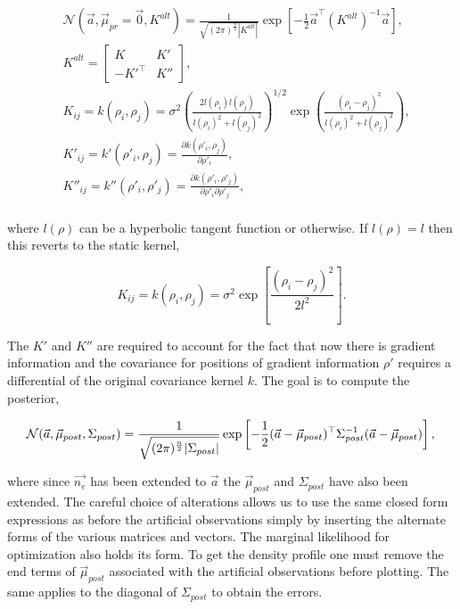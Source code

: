 \begin{equation}
\begin{aligned}
&\mathcal{N}(\vec{a}, \vec \mu_{pr} = \vec{0}, K^{alt}) = \frac{1}{\sqrt{(2\pi)^{\frac{n}{2}}|K^{alt}|}} \exp \left[{{-\frac{1}{2}\vec{a}^\top (K^{alt})^{-1}\vec{a}}}\right],\\
&K^{alt} = \begin{bmatrix} K & K'\\ -K'^\top & K''\end{bmatrix},\\
&K_{ij} = k(\rho_i, \rho_j) = \sigma^2 \left( \frac{2l(\rho_i)l(\rho_j)}{l(\rho_i)^2 + l(\rho_j)^2} \right)^{1/2} \exp\left({\frac{(\rho_i - \rho_j)^2}{l(\rho_i)^2+l(\rho_j)^2}}\right),\\
&K'_{ij} = k'(\rho'_i, \rho_j) = \frac{\partial k{(\rho'_i,\rho_j)}}{\partial \rho'_i},\\
&K''_{ij} = k''(\rho'_i, \rho'_j) = \frac{\partial k{(\rho'_i,\rho'_j)}}{\partial \rho'_i\partial \rho'_j},\\
\end{aligned}
\end{equation}

\noindent where $l(\rho)$ can be a hyperbolic tangent function or otherwise. If $l(\rho) = l$ then this reverts to the static kernel,

\begin{equation}
K_{ij} = k(\rho_i, \rho_j) = \sigma^2 \exp\left[{\frac{(\rho_i - \rho_j)^2}{2l^2}}\right].
\end{equation}

\noindent The $K'$  and $K''$ are required to account for the fact that now there is gradient information and the covariance for positions of gradient information $\rho'$ requires a differential of the original covariance kernel $k$. The goal is to compute the posterior,  

\begin{equation}
\mathcal{N}(\vec{a}, \vec{\mu}_{post}, \Sigma_{post}) = \frac{1}{\sqrt{(2\pi)^{\frac{n}{2}}|\Sigma_{post}|}} \exp \left[{{-\frac{1}{2}(\vec{a}-\vec{\mu}_{post})^\top\Sigma_{post}^{-1}(\vec{a}-\vec{\mu}_{post})}}\right],\\
\end{equation}

\noindent where since $\vec{n_e}$ has been extended to $\vec a$ the $\vec{\mu}_{post}$ and $\Sigma_{post}$ have also been extended. The careful choice of alterations allows us to use the same closed form expressions as before the artificial observations simply by inserting the alternate forms of the various matrices and vectors. The marginal likelihood for optimization also holds its form. To get the density profile one must remove the end terms of $\vec{\mu}_{post}$ associated with the artificial observations before plotting. The same applies to the diagonal of $\Sigma_{post}$ to obtain the errors. 